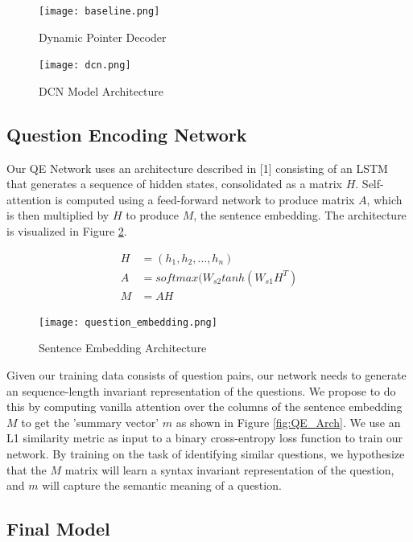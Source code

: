 \documentclass[a4paper, 11pt]{article}
\begin{document}
\begin{figure}[h!]
  \center
  \texttt{[image: baseline.png]}
  \caption{Dynamic Pointer Decoder}
\end{figure}

\begin{figure}[h!]
  \center
  \texttt{[image: dcn.png]}
  \caption{DCN Model Architecture}
  \label{fig:dcn}
\end{figure}

\subsection{Question Encoding Network}
Our QE Network uses an architecture described in [1] consisting of an LSTM that generates a sequence of hidden states, consolidated as a matrix $H$. Self-attention is computed using a feed-forward network to produce matrix $A$, which is then multiplied by $H$ to produce $M$, the sentence embedding. The architecture is visualized in Figure \ref{fig:question_embeddings}. 

\begin{equation}
\begin{split}
H & = (h_1,h_2,\dots,h_n) \\
A & = softmax(W_{s2}tanh(W_{s1}H^T) \\
M & = AH
\end{split}
\end{equation}

\begin{figure}[h!]
  \center
  \texttt{[image: question\_embedding.png]}
  \caption{Sentence Embedding Architecture}
  \label{fig:question_embeddings}
\end{figure}

Given our training data consists of question pairs, our network needs to generate an sequence-length invariant representation of the questions. We propose to do this by computing vanilla attention over the columns of the sentence embedding $M$ to get the 'summary vector' $m$ as shown in Figure \ref{fig:QE_Arch}. We use an L1 similarity metric as input to a binary cross-entropy loss function to train our network. By training on the task of identifying similar questions, we hypothesize that the $M$ matrix will learn a syntax invariant representation of the question, and $m$ will capture the semantic meaning of a question.

\subsection{Final Model} \label{final_model}
\end{document}
